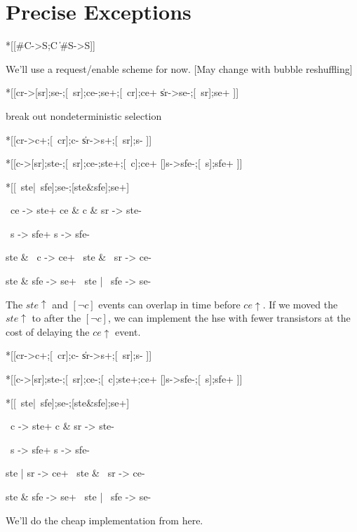 \documentclass{article}
\begin{document}
\section{Precise Exceptions}

\begin{csp}
*[[#C->S;C
  \|#S->S]]
\end{csp}

We'll use a request/enable scheme for now. [May change with bubble reshuffling]

\begin{hse}
*[[cr->[sr];se-;[~sr];ce-;se+;[~cr];ce+
  \|sr->se-;[~sr];se+
 ]]
\end{hse}

\noindent
break out nondeterministic selection

\begin{hse}
*[[cr->c+;[~cr];c-
  \|sr->s+;[~sr];s-
 ]]

*[[c->[sr];ste-;[~sr];ce-;ste+;[~c];ce+
  []s->sfe-;[~s];sfe+
 ]]

*[[~ste|~sfe];se-;[ste&sfe];se+]
\end{hse}

\begin{prs2}
~ce -> ste+
ce & c & sr -> ste-

~s -> sfe+
s -> sfe-
\end{prs2}

\begin{prs2}
ste & ~c -> ce+
~ste & ~sr -> ce-
\end{prs2}

\begin{prs2}
ste & sfe -> se+
~ste | ~sfe -> se-
\end{prs2}

\noindent
The $ste\uparrow$ and $[\neg c]$ events can overlap in time before $ce\uparrow$.
If we moved the $ste\uparrow$ to after the $[\neg c]$, 
we can implement the hse with fewer transistors at the cost of delaying the $ce\uparrow$ event.

\begin{hse}
*[[cr->c+;[~cr];c-
  \|sr->s+;[~sr];s-
 ]]

*[[c->[sr];ste-;[~sr];ce-;[~c];ste+;ce+
  []s->sfe-;[~s];sfe+
 ]]

*[[~ste|~sfe];se-;[ste&sfe];se+]
\end{hse}

\begin{prs2}
~c -> ste+
c & sr -> ste-

~s -> sfe+
s -> sfe-
\end{prs2}

\begin{prs2}
ste | sr -> ce+
~ste & ~sr -> ce-
\end{prs2}

\begin{prs2}
ste & sfe -> se+
~ste | ~sfe -> se-
\end{prs2}

\noindent
We'll do the cheap implementation from here.

\end{document}
